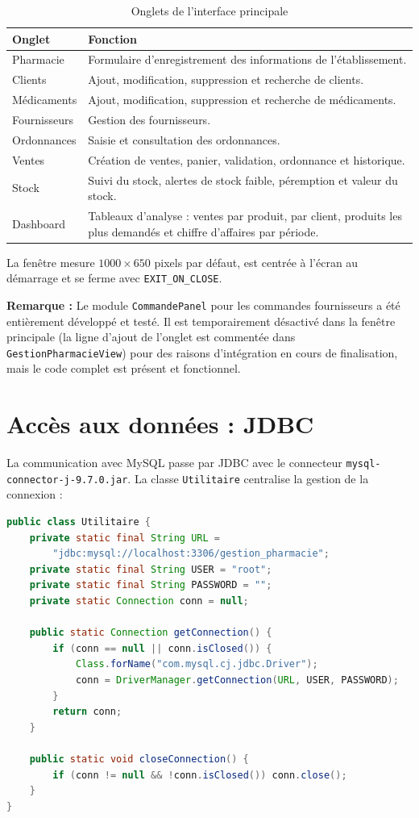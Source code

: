 \documentclass[12pt,a4paper]{report}
\begin{document}
\begin{table}[H]
\centering
\begin{tabularx}{\textwidth}{lX}
\toprule
\textbf{Onglet} & \textbf{Fonction} \\
\midrule
Pharmacie    & Formulaire d'enregistrement des informations de l'établissement. \\
Clients      & Ajout, modification, suppression et recherche de clients. \\
Médicaments  & Ajout, modification, suppression et recherche de médicaments. \\
Fournisseurs & Gestion des fournisseurs. \\
Ordonnances  & Saisie et consultation des ordonnances. \\
Ventes       & Création de ventes, panier, validation, ordonnance et historique. \\
Stock        & Suivi du stock, alertes de stock faible, péremption et valeur du stock. \\
Dashboard    & Tableaux d'analyse : ventes par produit, par client, produits les plus demandés et chiffre d'affaires par période. \\
\bottomrule
\end{tabularx}
\caption{Onglets de l'interface principale}
\end{table}

La fenêtre mesure $1000 \times 650$ pixels par défaut, est centrée à l'écran au démarrage et se ferme avec \texttt{EXIT\_ON\_CLOSE}.

\textbf{Remarque :} Le module \texttt{CommandePanel} pour les commandes fournisseurs a été entièrement développé et testé. Il est temporairement désactivé dans la fenêtre principale (la ligne d'ajout de l'onglet est commentée dans \texttt{GestionPharmacieView}) pour des raisons d'intégration en cours de finalisation, mais le code complet est présent et fonctionnel.

\section{Accès aux données : JDBC}

La communication avec MySQL passe par JDBC avec le connecteur \texttt{mysql-connector-j-9.7.0.jar}. La classe \texttt{Utilitaire} centralise la gestion de la connexion :

\begin{lstlisting}[language=Java,caption={Classe Utilitaire — connexion MySQL}]
public class Utilitaire {
    private static final String URL =
        "jdbc:mysql://localhost:3306/gestion_pharmacie";
    private static final String USER = "root";
    private static final String PASSWORD = "";
    private static Connection conn = null;

    public static Connection getConnection() {
        if (conn == null || conn.isClosed()) {
            Class.forName("com.mysql.cj.jdbc.Driver");
            conn = DriverManager.getConnection(URL, USER, PASSWORD);
        }
        return conn;
    }

    public static void closeConnection() {
        if (conn != null && !conn.isClosed()) conn.close();
    }
}
\end{lstlisting}
\end{document}

